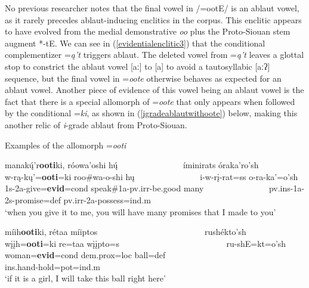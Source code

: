 No previous researcher notes that the final vowel in /=ootE/ is an ablaut vowel, as it rarely precedes ablaut-inducing enclitics in the corpus. This enclitic appears to have evolved from the medial demonstrative \textit{oo} plus the Proto-Siouan stem augment *-tE. We can see in (\ref{evidentialenclitic3}) that the conditional complementizer =\textit{ą't} triggers ablaut. The deleted vowel from =\textit{ą't} leaves a glottal stop to constrict the ablaut vowel [aː] to [a] to avoid a tautosyllabic [aːʔ] sequence, but the final vowel in =\textit{oote} otherwise behaves as expected for an ablaut vowel. Another piece of evidence of this vowel being an ablaut vowel is the fact that there is a special allomorph of =\textit{oote} that only appears when followed by the conditional =\textit{ki}, as shown in (\ref{igradeablautwithoote}) below, making this another relic of \textit{i}-grade ablaut from Proto-Siouan.

\newpage
\begin{exe}

\item\label{igradeablautwithoote} Examples of the allomorph =\textit{ooti}

	\begin{xlist}
	
	\item\label{igradeablautwithoote1}
	\glll manakų́'r\textbf{ooti}ki, róowa'oshi hų́ ~ ~ ~ ~ ~ ~ ~ ~ ~   íminirats óraka'ro'sh\\
	w-rą-kų'=\textbf{ooti}=ki roo\#wa-o-shi hų ~ ~ ~ ~ ~ ~ ~ ~ ~  i-w-rį-rat=ss o-ra-ka'=o'sh\\
	1s-2a-\textnormal{give}=\textbf{evid}=cond \textnormal{speak}\#1a-pv.irr-\textnormal{be.good} \textnormal{many} ~ ~ ~ ~ ~ ~ ~ ~ ~  pv.ins-1a-2s-\textnormal{promise}=def pv.irr-2a-\textnormal{possess}=ind.m\\
	\glt `when you give it to me, you will have many promises that I made to you' \citep[191]{hollow1973a}

	\item\label{igradeablautwithoote2}
	\glll míih\textbf{ooti}ki, rétaa míiptos ~ ~ ~ ~ ~ ~ ~ ~ ~ ~ ~ ~ ~ ~ ~ rushékto'sh\\
	wįįh=\textbf{ooti}=ki re=taa wįįpto=s ~ ~ ~ ~ ~ ~ ~ ~ ~ ~ ~ ~ ~ ~ ~   ru-shE=kt=o'sh\\
	\textnormal{woman}=\textbf{evid}=cond dem.prox=loc \textnormal{ball}=def ~ ~ ~ ~ ~ ~ ~ ~ ~ ~ ~ ~ ~ ~ ~  ins.hand-\textnormal{hold}=pot=ind.m\\
	\glt `if it is a girl, I will take this ball right here' \citep[86]{hollow1973a}
	
	\end{xlist}

\end{exe}

